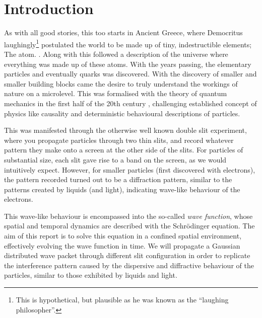 \section{Introduction}\label{sec:introduction}

As with all good stories, this too starts in Ancient Greece, where Democritus laughingly\footnote{This is hypothetical, but plausible as he was known as the ``laughing philosopher''.} postulated the world to be made up of tiny, indestructible elements; The atom. \citep{berryman_2016}. Along with this followed a description of the universe where everything was made up of these atoms. With the years passing, the elementary particles and eventually quarks was discovered. With the discovery of smaller and smaller building blocks came the desire to truly understand the workings of nature on a microlevel. This was formalised with the theory of quantum mechanics in the first half of the 20th century \citep{QMH}, challenging established concept of physics like causality and deterministic behavioural descriptions of particles. 

This was manifested through the otherwise well known double slit experiment, where you propagate particles through two thin slits, and record whatever pattern they make onto a screen at the other side of the slits. For particles of substantial size, each slit gave rise to a band on the screen, as we would intuitively expect. However, for smaller particles (first discovered with electrons), the pattern recorded turned out to be a diffraction pattern, similar to the patterns created by liquids (and light), indicating wave-like behaviour of the electrons. 

This wave-like behaviour is encompassed into the so-called \textit{wave function}, whose spatial and temporal dynamics are described with the Schrödinger equation. The aim of this report is to solve this equation in a confined spatial environment, effectively evolving the wave function in time. We will propagate a Gaussian distributed wave packet through different slit configuration in order to replicate the interference pattern caused by the dispersive and diffractive behaviour of the particles, similar to those exhibited by liquids and light.

